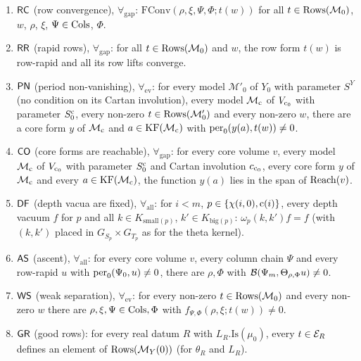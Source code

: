 \begin{definition}
\begin{enumerate}[label=(\arabic*),leftmargin=*]
datum $\Phi$ there is $F'\in\fsA(\mathcal M_n;\emptyset,1)$ with: for all $\rho,w$, the first $n$ row lifts of $t(w)$ converge and
$\Theta^{(n)}_{\rho,\Phi}\,t(w)=F'(\mathrm{vec}_n(\rho,w))$.
\item $\mathsf{RC}$ (row convergence), $\forall_{\mathrm{gap}}$: $\mathrm{FConv}(\rho,\xi,\Psi,\Phi;t(w))$ for all
$t\in\mathrm{Rows}(\mathcal M_0)$, $w$, $\rho$, $\xi$, $\Psi\in\mathrm{Cols}$, $\Phi$.
\item $\mathsf{RR}$ (rapid rows), $\forall_{\mathrm{gap}}$: for all $t\in\mathrm{Rows}(\mathcal M_0)$ and $w$, the row form $t(w)$ is
row-rapid and all its row lifts converge.
\item $\mathsf{PN}$ (period non-vanishing), $\forall_{\mathrm{ev}}$: for every model $\mathcal M'_0$ of $Y_0$ with parameter $S^Y$ (no
condition on its Cartan involution), every model $\mathcal M_{\mathrm{c}}$ of $V_{\mathrm{c}_0}$ with parameter $S^{\mathrm{c}}_0$, every non-zero
$t\in\mathrm{Rows}(\mathcal M'_0)$ and every non-zero $w$, there are a core form $y$ of $\mathcal M_{\mathrm{c}}$ and $a\in\mathrm{KF}(\mathcal M_{\mathrm{c}})$
with $\mathrm{per}_0(y(a),t(w))\neq0$.
\item $\mathsf{CO}$ (core forms are reachable), $\forall_{\mathrm{gap}}$: for every core volume $v$, every model $\mathcal M_{\mathrm{c}}$ of
$V_{\mathrm{c}_0}$ with parameter $S^{\mathrm{c}}_0$ and Cartan involution $c_{\mathrm{c}_0}$, every core form $y$ of $\mathcal M_{\mathrm{c}}$ and every
$a\in\mathrm{KF}(\mathcal M_{\mathrm{c}})$, the function $y(a)$ lies in the span of $\mathrm{Reach}(v)$.
\item $\mathsf{DF}$ (depth vacua are fixed), $\forall_{\mathrm{all}}$: for $i<m$, $p\in\{\chi(i,0),\mathrm{c}(i)\}$, every depth vacuum $f$
for $p$ and all $k\in K_{\mathrm{small}(p)}$, $k'\in K_{\mathrm{big}(p)}$: $\omega_p(k,k')f=f$ (with $(k,k')$ placed in
$G_{S_p}\times G_{T_p}$ as for the theta kernel).
\item $\mathsf{AS}$ (ascent), $\forall_{\mathrm{all}}$: for every core volume $v$, every column chain $\Psi$ and every row-rapid $u$
with $\mathrm{per}_0(\Psi_0,u)\ne0$, there are $\rho,\Phi$ with $\mathcal B(\Psi_m,\Theta_{\rho,\Phi}u)\neq0$.
\item $\mathsf{WS}$ (weak separation), $\forall_{\mathrm{ev}}$: for every non-zero $t\in\mathrm{Rows}(\mathcal M_0)$ and every non-zero $w$
there are $\rho,\xi,\Psi\in\mathrm{Cols},\Phi$ with $f_{\Psi,\Phi}(\rho,\xi;t(w))\neq0$.
\item $\mathsf{GR}$ (good rows): for every real datum $R$ with $L_R.\mathrm{Is}(\mu_0)$, every $t\in\mathcal E_R$ defines an element of
$\mathrm{Rows}(\mathcal M_Y(0))$ (for $\theta_R$ and $L_R$).
\end{enumerate}
\end{definition}

